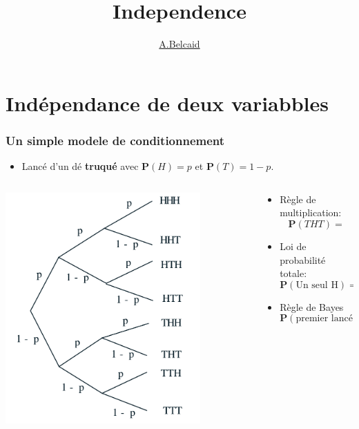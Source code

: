 \documentclass{beamer}
\title{Independence}
\author{\underline{A.Belcaid}}
\institute{\small ENSA-Safi}
\begin{document}
\maketitle

\begin{frame}
\tableofcontents
\end{frame}

\section{Indépendance de deux variabbles}

\begin{frame}[t]
  \frametitle{Un simple modele de conditionnement}
  \begin{itemize}
  \small
  \item Lancé d'un dé \textbf{truqué} avec $\mathbf{P}(H)=p$ et $\mathbf{P}(T)=
    1 - p$.
  \end{itemize}
 \begin{columns}
   \begin{column}{0.4\textwidth}
       \centering
       \includegraphics[width=0.8\textwidth]{example_tree_mdel.png}
   \end{column}
   \begin{column}{0.6\textwidth}
    \begin{itemize}
      \scriptsize
      \item Règle de multiplication:
        $$
        \mathbf{P}(THT) = 
        $$
      \item Loi de probabilité totale:
        $$
        \mathbf{P}(\text{Un seul H}) = 
        $$
      \item Règle de Bayes
        $$
        \mathbf{P}(\text{premier lancé est H}\;|\;  \text{ 1 seul H}) = 
        $$

    \end{itemize} 
   \end{column}
 \end{columns} 
\end{frame}
\end{document}
